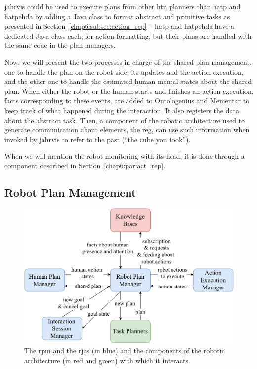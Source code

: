\documentclass[a4paper,11pt,twoside]{StyleThese}
\begin{document}
\bigskip
\acrshort{jahrvis} could be used to execute plans from other \acrshort{htn} planners than \acrshort{hatp} and \acrshort{hatpehda} by adding a Java class to format abstract and primitive tasks as presented in Section~\ref{chap6:subsec:action_rep} -- \acrshort{hatp} and \acrshort{hatpehda} have a dedicated Java class each, for action formatting, but their plans are handled with the same code in the plan managers.

Now, we will present the two processes in charge of the shared plan management, one to handle the plan on the robot side, \ie its updates and the action execution, and the other one to handle the estimated human mental states about the shared plan. When either the robot or the human starts and finishes an action execution, facts corresponding to these events, are added to Ontologenius and Mementar to keep track of what happened during the interaction. It also registers the data about the abstract task. Then, a component of the robotic architecture used to generate communication about elements, the \acrfull{reg}, can use such information when invoked by \acrshort{jahrvis} to refer to the past (\eg ``the cube you took'').

When we will mention the robot monitoring with its head, it is done through a component described in Section~\ref{chap6:par:act_rep}.

\subsection{Robot Plan Management}\label{chap6:subsec:robot_plan}

\begin{figure}[!hbt]
	\centering
	\includegraphics[width=0.85\linewidth]{figures/chapter2/robot_manager_zoom.pdf}
	\caption{The \acrlong{rpm} and the \acrshort{rja}s (in blue) and the components of the robotic architecture (in red and green) with which it interacts.}
	\label{chap6:fig:rob_manager_zoom}
\end{figure}
\end{document}
